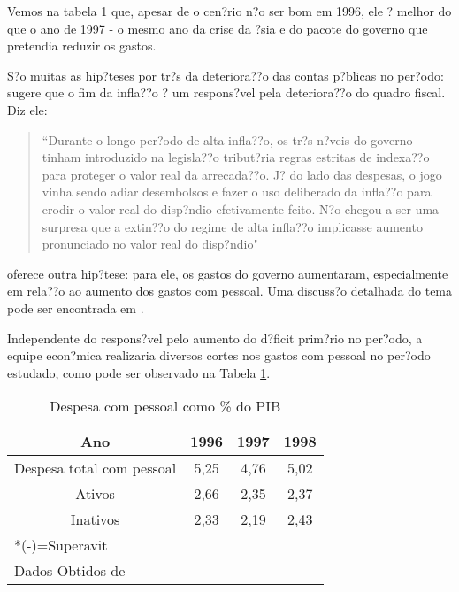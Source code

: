 \documentclass{article}
\begin{document}
Vemos na tabela 1 que, apesar de o cen?rio n?o ser bom em 1996, ele ? melhor do que o ano de 1997 - o mesmo ano da crise da ?sia e do pacote do governo que pretendia reduzir os gastos. %

S?o muitas as hip?teses por tr?s da deteriora??o das contas p?blicas no per?odo: \citet{Werneck2014} sugere que o fim da infla??o ? um respons?vel pela deteriora??o do quadro fiscal. Diz ele:

\begin{quote}

``Durante o longo per?odo de alta infla??o, os tr?s n?veis do governo tinham introduzido na legisla??o tribut?ria regras estritas de indexa??o para proteger o valor real da arrecada??o. J? do lado das despesas, o jogo vinha sendo adiar desembolsos e fazer o uso deliberado da infla??o para erodir o valor real do disp?ndio efetivamente feito. N?o chegou a ser uma surpresa que a extin??o do regime de alta infla??o implicasse aumento pronunciado no valor real do disp?ndio"

\end{quote}

\citet{Giambiagi2002} oferece outra hip?tese: para ele, os gastos do governo aumentaram, especialmente em rela??o ao aumento dos gastos com pessoal. Uma discuss?o detalhada do tema pode ser encontrada em \citet{Grossmann1998}.

Independente do respons?vel pelo aumento do d?ficit prim?rio no per?odo, a equipe econ?mica realizaria diversos cortes nos gastos com pessoal no per?odo estudado, como pode ser observado na Tabela \ref{tab:DepesaPessoal}.

\begin{table}[h]
\begin{center}
\begin{tabular}[c]{|c|c|c|c|}
\hline
Ano & 1996 & 1997 & 1998\\ \hline
Despesa total com pessoal & 5,25 & 4,76 & 5,02 \\ \hline
Ativos & 2,66 & 2,35 & 2,37\\ \hline
Inativos & 2,33 & 2,19 & 2,43 \\ \hline
\multicolumn{4}{l}{*(-)=Superavit} \\
\multicolumn{4}{l}{Dados Obtidos de \citet{Giambiagi2002}} \\
\end{tabular}
\caption{Despesa com pessoal como \% do PIB} \label{tab:DepesaPessoal} %
\end{center}
\end{table}
\end{document}
